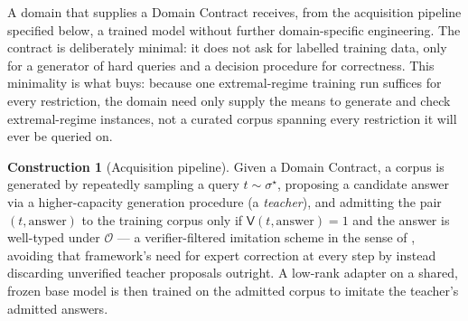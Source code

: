 \documentclass[11pt,twocolumn,a4paper]{article}
\theoremstyle{rdm}
\theoremstyle{definition}
\newtheorem{construction}[theorem]{Construction}
\theoremstyle{remark}
\newcommand{\Verd}{\mathsf{V}}
\begin{document}
A domain that supplies a Domain Contract receives, from the acquisition
pipeline specified below, a trained model without further domain-specific
engineering. The contract is deliberately minimal: it does not ask for
labelled training data, only for a generator of hard queries and a decision
procedure for correctness. This minimality is what 
buys: because one extremal-regime training run suffices for every
restriction, the domain need only supply the means to generate and check
extremal-regime instances, not a curated corpus spanning every restriction
it will ever be queried on.

\begin{construction}[Acquisition pipeline]
\label{con:acquisition}
Given a Domain Contract, a corpus is generated by repeatedly sampling a
query $t \sim \sigma^\star$, proposing a candidate answer via a
higher-capacity generation procedure (a \emph{teacher}), and admitting the
pair $(t,\text{answer})$ to the training corpus only if
$\Verd(t,\text{answer})=1$ and the answer is well-typed under $\mathcal{O}$
--- a verifier-filtered imitation scheme in the sense of
\citet{ross2011}, avoiding that framework's need for expert
correction at every step by instead discarding unverified teacher proposals
outright. A low-rank adapter \citep{hu2022lora,houlsby2019} on a shared,
frozen base model \citep{brown2020} is then trained on the
admitted corpus to imitate the teacher's admitted answers.
\end{construction}
\end{document}
